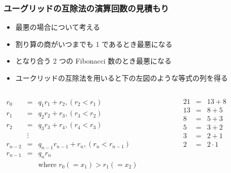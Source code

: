 \begin{frame}[fragile]
\frametitle{ユーグリッドの互除法の演算回数の見積もり}
  \begin{itemize}
\item 最悪の場合について考える
\item 割り算の商がいつまでも 1 であるとき最悪になる
\item となり合う 2 つの Fibonacci 数のとき最悪になる
\item ユークリッドの互除法を用いると下の左図のような等式の列を得る
  \end{itemize}
  \begin{columns}[t]
    \begin{column}{0.45\textwidth}
\centering
      \begin{math}
        \begin{array}{rcl}
r_0 &=& q_1 r_1 + r_2, (r_2<r_1)\\
r_1 &=& q_2 r_2 + r_3, (r_3<r_2)\\
r_2 &=& q_3 r_3 + r_4, (r_4<r_3)\\
&\vdots&\\
r_{n-2} &=& q_{n-1}r_{n-1} + r_{n}, (r_n<r_{n-1})\\
r_{n-1} &=& q_{n}r_{n}\\
&&\mbox{where } r_0(=x_1)>r_1(=x_2)
        \end{array}
      \end{math}
    \end{column}
    \begin{column}{0.45\textwidth}
\centering
      \begin{math}
        \begin{array}{rcl}
21 &=& 13 + 8\\
13 &=& 8 + 5\\
 8 &=& 5 + 3\\
 5 &=& 3 + 2\\
 3 &=& 2 + 1\\
 2 &=& 2 \cdot 1
        \end{array}
      \end{math}
    \end{column}
  \end{columns}
\end{frame}
\newcommand{\fib}{\mathop{\mathrm{fib}}\nolimits}
